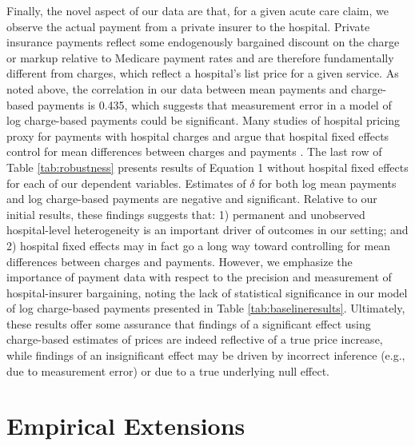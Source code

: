 \documentclass[12pt]{article}
\begin{document}
Finally, the novel aspect of our data are that, for a given acute care claim, we observe the actual payment from a private insurer to the hospital. Private insurance payments reflect some endogenously bargained discount on the charge or markup relative to Medicare payment rates and are therefore fundamentally different from charges, which reflect a hospital's list price for a given service. As noted above, the correlation in our data between mean payments and charge-based payments is 0.435, which suggests that measurement error in a model of log charge-based payments could be significant. Many studies of hospital pricing proxy for payments with hospital charges and argue that hospital fixed effects control for mean differences between charges and payments \citep{cutler2000}. The last row of Table \ref{tab:robustness} presents results of Equation 1 without hospital fixed effects for each of our dependent variables.  Estimates of $\delta$ for both log mean payments and log charge-based payments are negative and significant. Relative to our initial results, these findings suggests that: 1) permanent and unobserved hospital-level heterogeneity is an important driver of outcomes in our setting; and 2) hospital fixed effects may in fact go a long way toward controlling for mean differences between charges and payments. However, we emphasize the importance of payment data with respect to the precision and measurement of hospital-insurer bargaining, noting the lack of statistical significance in our model of log charge-based payments presented in Table \ref{tab:baselineresults}. Ultimately, these results offer some assurance that findings of a significant effect using charge-based estimates of prices are indeed reflective of a true price increase, while findings of an insignificant effect may be driven by incorrect inference (e.g., due to measurement error) or due to a true underlying null effect.

\section{Empirical Extensions}
\label{sec:Ext}
\end{document}
